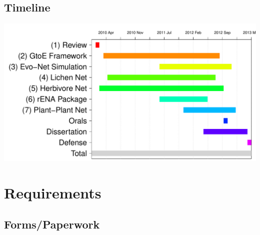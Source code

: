 \documentclass[12pt]{article}
\begin{document}
\subsection{Timeline}

\includegraphics{committee_meeting-001}



\section{Requirements}

\subsection{Forms/Paperwork}
\end{document}
